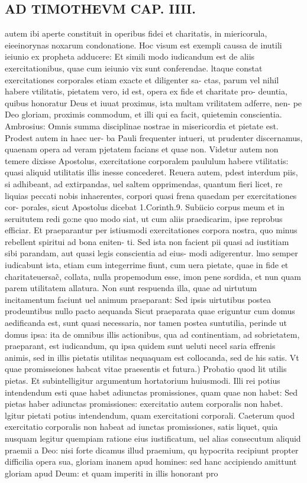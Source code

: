 \documentclass{article}
\begin{document}
\begin{pages}
\section*{AD TIMOTHEVM CAP. IIII. }
\marginpar{[ p.97 ]}\pstart autem ibi aperte constituit in operibus fidei et charitatis, in miericorula, eieeinorynas noxarum condonatione. Hoc visum est exempli caussa de inutili ieiunio ex propheta adducere: Et simili modo iudicandum est de aliis exercitationibus, quae cum ieiunio vix sunt conferendae. ltaque constat exercitationes corporales etiam exacte et diligenter sa- ctas, parum vel nihil habere vtilitatis, pietatem vero, id est, opera ex fide et charitate pro- deuntia, quibus honoratur Deus et iuuat proximus, ista multam vrilitatem adferre, nen- pe Deo gloriam, proximis commodum, et illi qui ea facit, quietemin conscientia. Ambrosius: Omnis summa disciplinae nostrae in misericordia et pietate est. Prodest autem in haec uer- ba Pauli frequenter intueri, ut prudenter discernamus, quaenam opera ad veram pjetatem facians et quae non. Videtur autem non temere dixisse Apostolus, exercitatione corporalem paululum habere vtilitatis: quasi aliquid utilitatis illis inesse concederet. Reuera autem, pdest interdum piis, si adhibeant, ad extirpandas, uel saltem opprimendas, quantum fieri licet, re liquias peccati nobis inhaerentes, corpori quasi frena quaedam per exercitationes cor- porales, sicut Apostolus dicebat 1.Corinth.9. Subiicio corpus meum et in seruitutem redi go:ne quo modo siat, ut cum aliis praedicarim, ipse reprobus efficiar. Et praeparantur per istiusmodi exercitationes corpora nostra, quo minus rebellent spiritui ad bona eniten- ti. Sed ista non facient pii quasi ad iustitiam sibi parandam, aut quasi legis conscientia ad eius- modi adigerentur. lmo semper iudicabunt ista, etiam cum integerrime fiunt, cum uera pietate, quae in fide et charitateuersac̃, collata, nulla propemodum esse, imon pene sordida, et nun quam parem utilitatem allatura. Non sunt respuenda illa, quae ad uirtutum incitamentum faciunt uel animum praeparant: Sed ipsis uirtutibus postea prodeuntibus nullo pacto aequanda Sicut praeparata quae eriguntur cum domus aedificanda est, sunt quasi necessaria, nor tamen postea suntutilia, perinde ut domus ipsa: ita de omnibus illis actionibus, qua ad continentiam, ad sobrietatem, praeparant, est iudicandum, qu ipsa quidem sunt ueluti necel saria effrenis animis, sed in illis pietatis utilitas nequaquam est collocanda, sed de his satis.  \pend\pstart Vt quae promisseiones habcat vitae praesentis et futura.) Probatio quod lit utilis pietas. Et subintelligitur argumentum hortatorium huiusmodi. Illi rei potius intendendum esti quae habet adiunctas promissiones, quam quae non habet: Sed pietas haber adiunctas promissiones: exercitatio autem corporalis non habet. lgitur pietati potius intendendum, quam exercitationi corporali. Caeterum quod exercitatio corporalis non habeat ad iunctas promissiones, satis liquet, quia nusquam legitur quempiam ratione eius iustificatum, uel alias consecutum aliquid praemii a Deo: nisi forte dicamus illud praemium, qu hypocrita recipiunt propter difficilia opera sua, gloriam inanem apud homines: sed hanc accipiendo amittunt gloriam apud Deum: et quam imperiti in illis honorant pro 
\end{pages}
\end{document}
